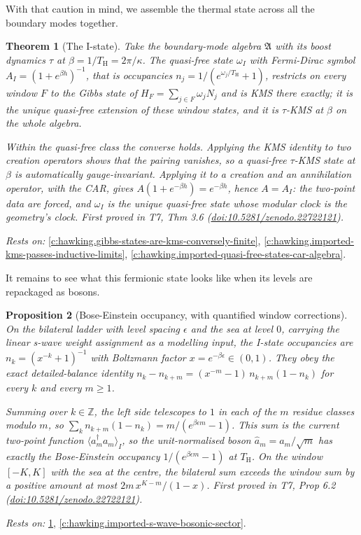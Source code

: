 \documentclass[11pt]{article}
\newtheorem{theorem}{Theorem}[section]
\newtheorem{proposition}[theorem]{Proposition}
\theoremstyle{definition}
\theoremstyle{plain}
\providecommand{\TH}{}\renewcommand{\TH}{T_{\mathrm{H}}}
\providecommand{\Z}{}\renewcommand{\Z}{\mathbb{Z}}
\begin{document}
With that caution in mind, we assemble the thermal state across all the boundary modes together.

\begin{theorem}[The I-state]\label{c:hawking.i-state}
Take the boundary-mode algebra $\mathfrak{A}$ with its boost dynamics $\tau$ at $\beta = 1/\TH = 2\pi/\kappa$. The quasi-free state $\omega_I$ with Fermi-Dirac symbol $A_I = (1+e^{\beta h})^{-1}$, that is occupancies $n_j = 1/(e^{\omega_j/\TH}+1)$, restricts on every window $F$ to the Gibbs state of $H_F = \sum_{j\in F}\omega_j N_j$ and is KMS there exactly; it is the unique quasi-free extension of these window states, and it is $\tau$-KMS at $\beta$ on the whole algebra.

Within the quasi-free class the converse holds. Applying the KMS identity to two creation operators shows that the pairing vanishes, so a quasi-free $\tau$-KMS state at $\beta$ is automatically gauge-invariant. Applying it to a creation and an annihilation operator, with the CAR, gives $A(1+e^{-\beta h}) = e^{-\beta h}$, hence $A = A_I$: the two-point data are forced, and $\omega_I$ is the unique quasi-free state whose modular clock is the geometry's clock.
\emph{First proved in} T7, Thm 3.6 (\href{https://doi.org/10.5281/zenodo.22722121}{doi:10.5281/zenodo.22722121}).
\end{theorem}
\noindent\emph{Rests on:} \ref{c:hawking.gibbs-states-are-kms-conversely-finite}, \ref{c:hawking.imported-kms-passes-inductive-limits}, \ref{c:hawking.imported-quasi-free-states-car-algebra}.

It remains to see what this fermionic state looks like when its levels are repackaged as bosons.

\begin{proposition}[Bose-Einstein occupancy, with quantified window corrections]\label{c:hawking.bose-einstein-occupancy-quantified-window-corrections}
On the bilateral ladder with level spacing $\epsilon$ and the sea at level $0$, carrying the linear s-wave weight assignment as a modelling input, the I-state occupancies are $n_k = (x^{-k}+1)^{-1}$ with Boltzmann factor $x = e^{-\beta\epsilon} \in (0,1)$. They obey the exact detailed-balance identity $n_k - n_{k+m} = (x^{-m}-1)\,n_{k+m}(1-n_k)$ for every $k$ and every $m \ge 1$.

Summing over $k \in \Z$, the left side telescopes to $1$ in each of the $m$ residue classes modulo $m$, so $\sum_{k} n_{k+m}(1-n_k) = m/(e^{\beta\epsilon m}-1)$. This sum is the current two-point function $\langle a_m^\dagger a_m\rangle_I$, so the unit-normalised boson $\hat a_m = a_m/\sqrt{m}$ has exactly the Bose-Einstein occupancy $1/(e^{\beta\epsilon m}-1)$ at $\TH$. On the window $[-K, K]$ with the sea at the centre, the bilateral sum exceeds the window sum by a positive amount at most $2m\,x^{K-m}/(1-x)$.
\emph{First proved in} T7, Prop 6.2 (\href{https://doi.org/10.5281/zenodo.22722121}{doi:10.5281/zenodo.22722121}).
\end{proposition}
\noindent\emph{Rests on:} \ref{c:hawking.i-state}, \ref{c:hawking.imported-s-wave-bosonic-sector}.
\end{document}
